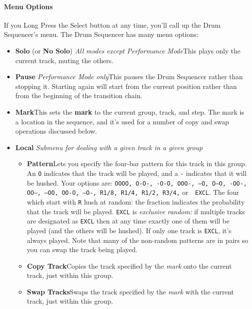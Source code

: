 \documentclass{article}
\newcommand\bump{\vspace{11in}}
\begin{document}
\paragraph{Menu Options}

If you Long Press the Select button at any time, you'll call up the Drum Sequencer's menu.  The Drum Sequencer has many menu options:

\begin{itemize}
\item {\bf Solo} (or {\bf No Solo}) {\it All modes except Performance Mode}\quad This plays only the current track, muting the others.
\item {\bf Pause} {\it Performance Mode only}\quad This pauses the Drum Sequencer rather than stopping it.  Starting again will start from the current position rather than from the beginning of the transition chain.
\item {\bf Mark}\quad This sets the {\bf mark} to the current group, track, and step.  The mark is a location in the sequence, and it's used for a number of copy and swap operations discussed below.

\bump

\item {\bf Local} {\it Submenu for dealing with a given track in a given group} \quad 
\begin{itemize}
\item {\bf Pattern}\quad Lets you specify the four-bar pattern for this track in this group.  An {\tt O} indicates that the track will be played, and a {\tt -} indicates that it will be hushed.  Your options are: \texttt{OOOO, O-O-, -O-O, OOO-, ---O, O--O, -OO-, OO--, --OO, OO-O, --O-, R1/8, R1/4, R1/2, R3/4,} or\ \ {\tt EXCL}.  The four which start with {\tt R} hush at random: the fraction indicates the probability that the track will be played.  {\tt EXCL} is {\it exclusive random:} if multiple tracks are designated as {\tt EXCL} then at any time exactly one of them will be played (and the others will be hushed).  If only one track is {\tt EXCL}, it's always played.  Note that many of the non-random patterns are in pairs so you can swap the track being played.
\item {\bf Copy Track}\quad Copies the track specified by the {\it mark} onto the current track,  just within this group.
\item {\bf Swap Tracks}\quad Swaps the track specified by the {\it mark} with the current track, just within this group.
\end{itemize}


\end{itemize}
\end{document}
